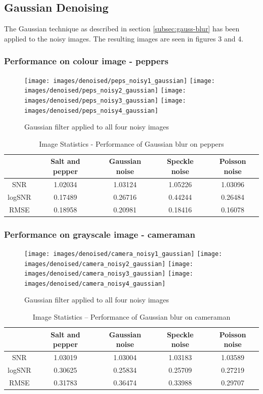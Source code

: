 \documentclass{article}
\begin{document}
\subsection{Gaussian Denoising}
\label{subsec:gauss-denoise}
The Gaussian technique as described in section \ref{subsec:gauss-blur} has been applied
to the noisy images. The resulting images are seen in figures 3 and 4.
\subsubsection{Performance on colour image - peppers}
\begin{figure}[H]
  \centering
  \texttt{[image: images/denoised/peps\_noisy1\_gaussian]}
  \texttt{[image: images/denoised/peps\_noisy2\_gaussian]}
  \texttt{[image: images/denoised/peps\_noisy3\_gaussian]}
  \texttt{[image: images/denoised/peps\_noisy4\_gaussian]}
  \caption{Gaussian filter applied to all four noisy images }
\end{figure}
\begin{table}[H]
  \centering
  \begin{tabular}{c|c|c|c|c}
    & Salt and pepper & Gaussian noise & Speckle noise & Poisson noise \\
    \hline
    SNR & 1.02034 & 1.03124 & 1.05226 & 1.03096 \\
    logSNR & 0.17489 & 0.26716 & 0.44244 & 0.26484 \\
    RMSE & 0.18958 & 0.20981 & 0.18416 & 0.16078 \\
  \end{tabular}
\caption{Image Statistics - Performance of Gaussian blur on peppers}
\end{table}
%
\subsubsection{Performance on grayscale image - cameraman}
\begin{figure}[H]
  \centering
  \texttt{[image: images/denoised/camera\_noisy1\_gaussian]}
  \texttt{[image: images/denoised/camera\_noisy2\_gaussian]}
  \texttt{[image: images/denoised/camera\_noisy3\_gaussian]}
  \texttt{[image: images/denoised/camera\_noisy4\_gaussian]}
  \caption{Gaussian filter applied to all four noisy images }
\end{figure}
%
\begin{table}[H]
  \centering
  \begin{tabular}{c|c|c|c|c}
    & Salt and pepper & Gaussian noise & Speckle noise & Poisson noise \\
    \hline
    SNR & 1.03019 & 1.03004 & 1.03183 & 1.03589 \\
    logSNR & 0.30625 & 0.25834 & 0.25709 & 0.27219 \\
    RMSE &  0.31783 & 0.36474 & 0.33988 & 0.29707 \\
  \end{tabular}
  \caption{Image Statistics -- Performance of Gaussian blur on cameraman}
\end{table}
%
\end{document}

